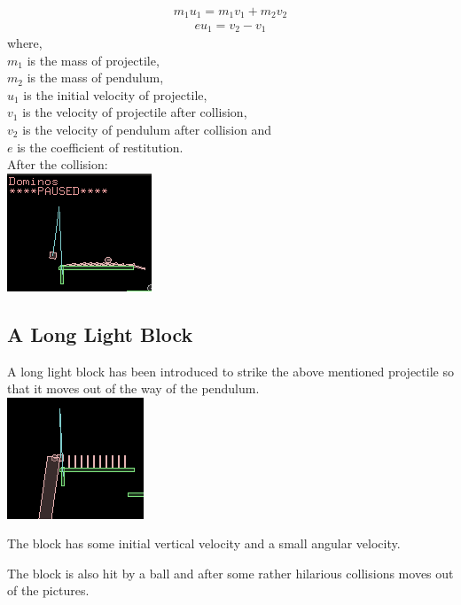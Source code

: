 \documentclass[11pt]{article}
\begin{document}
\begin{align}
m_1u_1 = m_1v_1 + m_2v_2
\end{align}
\begin{align}
eu_1 = v_2 - v_1
\end{align}
where,\\
$m_1$ is the mass of projectile,\\
$m_2$ is the mass of pendulum,\\
$u_1$ is the initial velocity of projectile,\\
$v_1$ is the velocity of projectile after collision,\\
$v_2$ is the velocity of pendulum after collision and\\
$e$ is the coefficient of restitution.\\

After the collision: \\

\includegraphics[scale=0.7,natwidth=163,natheight=133]{./12.png}

\pagebreak

\subsection{A Long Light Block}
A long light block has been introduced to strike the above mentioned projectile so that it moves out of the way of the pendulum.\\

\includegraphics[scale=0.7,natwidth=154,natheight=137]{./21.png}

The block has some initial vertical velocity and a small angular velocity. 

The block is also hit by a ball and after some rather hilarious collisions moves out of the pictures.\\
\end{document}
